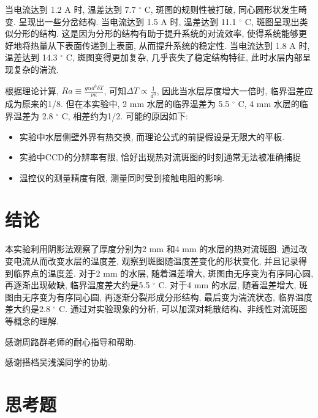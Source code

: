\documentclass[font=default]{mpltx}
\begin{document}
  \par
  当电流达到 1.2 A 时, 温差达到 7.7 $^\circ$ C, 斑图的规则性被打破, 同心圆形状发生畸变. 呈现出一些分岔结构.
  当电流达到 1.5 A 时, 温差达到 11.1 $^\circ$ C, 斑图呈现出类似分形的结构. 这是因为分形的结构有助于提升系统的对流效率, 使得系统能够更好地将热量从下表面传递到上表面, 从而提升系统的稳定性.
  当电流达到 1.8 A 时, 温差达到 14.3 $^\circ$ C, 斑图变得更加复杂, 几乎丧失了稳定结构特征, 此时水层内部呈现复杂的湍流.

  \par
  根据理论计算, $Ra\equiv\frac{g\alpha d^3\delta T}{\nu\kappa}$, 可知$\Delta T \propto \frac{1}{d^3}$, 因此当水层厚度增大一倍时, 临界温差应成为原来的1/8.
  但在本实验中, 2 mm 水层的临界温差为 5.5 $^\circ$ C, 4 mm 水层的临界温差为 2.8 $^\circ$ C, 相差约为1/2. 可能的原因如下:
  \begin{itemize}
    \item 实验中水层侧壁外界有热交换, 而理论公式的前提假设是无限大的平板.
    \item 实验中CCD的分辨率有限, 恰好出现热对流斑图的时刻通常无法被准确捕捉
    \item 温控仪的测量精度有限, 测量同时受到接触电阻的影响.
  \end{itemize}


\section{结论}
  本实验利用阴影法观察了厚度分别为2 mm 和4 mm 的水层的热对流斑图. 通过改变电流从而改变水层的温度差, 观察到斑图随温度差变化的形状变化, 并且记录得到临界点的温度差. 
  对于2 mm 的水层, 随着温差增大, 斑图由无序变为有序同心圆, 再逐渐出现破缺, 临界温度差大约是5.5 $^\circ$ C.
  对于4 mm 的水层, 随着温差增大, 斑图由无序变为有序同心圆, 再逐渐分裂形成分形结构, 最后变为湍流状态, 临界温度差大约是2.8 $^\circ$ C.
  通过对实验现象的分析, 可以加深对耗散结构、非线性对流斑图等概念的理解.

\begin{acknowledgments}
  感谢周路群老师的耐心指导和帮助.
  \par
  感谢搭档吴浅溪同学的协助.
\end{acknowledgments}



\clearpage %
\appendix %
\section{思考题}\label{app:exercise}
\end{document}
